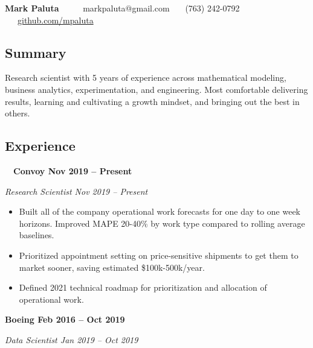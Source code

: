 \documentclass[10pt,letterpaper]{article}
\begin{document}
    \begin{center}
    {\LARGE \textbf{Mark Paluta}} \ \ \ \ \
    markpaluta@gmail.com \ \textbullet \ \ (763) 242-0792 \ \textbullet \ \ \href{https://github.com/mpaluta}{github.com/mpaluta}
    \end{center}

\subsection*{Summary}

    \begin{adjustwidth}{1.25em}{}
        Research scientist with 5 years of experience across mathematical modeling, business analytics, experimentation, and engineering. Most comfortable delivering results, learning and cultivating a growth mindset, and bringing out the best in others.
    \end{adjustwidth}

\subsection*{Experience}

    \quad \ \ \textbf{Convoy \hfill Nov 2019 – Present}

        \quad \emph{Research Scientist \hfill Nov 2019 – Present}

            \begin{itemize}[label={--}, leftmargin=.5in, labelindent=16pt, topsep=1pt]
                \setlength\itemsep{-.25em}
            	\item Built all of the company operational work forecasts for one day to one week horizons. Improved MAPE 20-40\% by work type compared to rolling average baselines.
            	\item Prioritized appointment setting on price-sensitive shipments to get them to market sooner, saving estimated \$100k-500k/year.
            	\item Defined 2021 technical roadmap for prioritization and allocation of operational work.
            \end{itemize}

    \textbf{Boeing \hfill Feb 2016 – Oct 2019}

        \quad \emph{Data Scientist \hfill Jan 2019 – Oct 2019}
\end{document}
